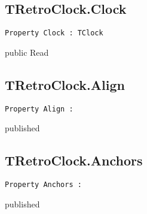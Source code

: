 \subsection{TRetroClock.Clock}
\label{hmi:retroclock:tretroclock:clock}
\begin{FPCList}
\Declaration 

\begin{verbatim}
Property Clock : TClock
\end{verbatim}
\Visibility
public
\Access
Read
\end{FPCList}
\subsection{TRetroClock.Align}
\label{hmi:retroclock:tretroclock:align}
\begin{FPCList}
\Declaration 

\begin{verbatim}
Property Align : 
\end{verbatim}
\Visibility
published
\Access

\end{FPCList}
\subsection{TRetroClock.Anchors}
\label{hmi:retroclock:tretroclock:anchors}
\begin{FPCList}
\Declaration 

\begin{verbatim}
Property Anchors : 
\end{verbatim}
\Visibility
published
\Access

\end{FPCList}
